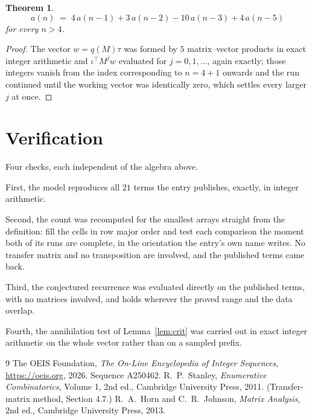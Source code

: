 \documentclass[11pt,a4paper]{article}
\theoremstyle{plain}
\newtheorem{theorem}{Theorem}
\theoremstyle{definition}
\begin{document}
\begin{theorem}
\[
a(n)\;=\;4\,a(n-1) + 3\,a(n-2) - 10\,a(n-3) + 4\,a(n-5)
\]
for every $n>4$.
\end{theorem}

\begin{proof}
The vector $w=q(M)\tau$ was formed by $5$ matrix--vector products in exact integer
arithmetic and $\iota^{\!\top}M^{j}w$ evaluated for $j=0,1,\dots$, again exactly; those
integers vanish from the index corresponding to $n=4+1$ onwards and the run continued
until the working vector was identically zero, which settles every larger $j$ at once.
\end{proof}

\section{Verification}

Four checks, each independent of the algebra above.

First, the model reproduces all $21$ terms the entry publishes, exactly, in integer
arithmetic.

Second, the count was recomputed for the smallest arrays straight from the definition: fill the
cells in row major order and test each comparison the moment both of its runs are complete,
in the orientation the entry's own name writes. No transfer matrix and no transposition are
involved, and the published terms came back.

Third, the conjectured recurrence was evaluated directly on the published terms, with no
matrices involved, and holds wherever the proved range and the data overlap.

Fourth, the annihilation test of Lemma~\ref{lem:crit} was carried out in exact integer
arithmetic on the whole vector rather than on a sampled prefix.

\begin{thebibliography}{9}
 The OEIS Foundation, \emph{The On-Line Encyclopedia of Integer
Sequences}, \url{https://oeis.org}, 2026. Sequence A250462.
 R.~P.~Stanley, \emph{Enumerative Combinatorics}, Volume 1, 2nd ed.,
Cambridge University Press, 2011. (Transfer-matrix method, Section 4.7.)
 R.~A.~Horn and C.~R.~Johnson, \emph{Matrix Analysis}, 2nd ed., Cambridge
University Press, 2013.
\end{thebibliography}
\end{document}
